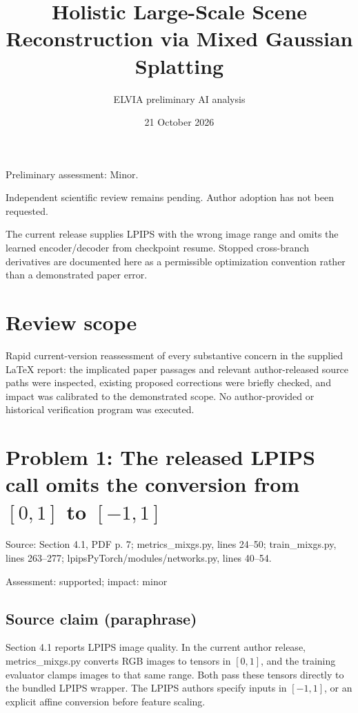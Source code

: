 \documentclass[11pt]{article}
\begin{document}
\title{Holistic Large-Scale Scene Reconstruction via Mixed Gaussian Splatting}

\author{ELVIA preliminary AI analysis}\date{21 October 2026}\maketitle

Preliminary assessment: Minor.\par

Independent scientific review remains pending. Author adoption has not been requested.

The current release supplies LPIPS with the wrong image range and omits the learned encoder/decoder from checkpoint resume. Stopped cross-branch derivatives are documented here as a permissible optimization convention rather than a demonstrated paper error.

\section*{Review scope}

Rapid current-version reassessment of every substantive concern in the supplied LaTeX report: the implicated paper passages and relevant author-released source paths were inspected, existing proposed corrections were briefly checked, and impact was calibrated to the demonstrated scope. No author-provided or historical verification program was executed.

\section*{Problem 1: The released LPIPS call omits the conversion from \([0,1]\) to \([-1,1]\)}

Source: Section 4.1, PDF p. 7; metrics\_mixgs.py, lines 24–50; train\_mixgs.py, lines 263–277; lpipsPyTorch/modules/networks.py, lines 40–54.

Assessment: supported; impact: minor

\subsection*{Source claim (paraphrase)}

Section 4.1 reports LPIPS image quality. In the current author release, metrics\_mixgs.py converts RGB images to tensors in \([0,1]\), and the training evaluator clamps images to that same range. Both pass these tensors directly to the bundled LPIPS wrapper. The LPIPS authors specify inputs in \([-1,1]\), or an explicit affine conversion before feature scaling.
\end{document}
